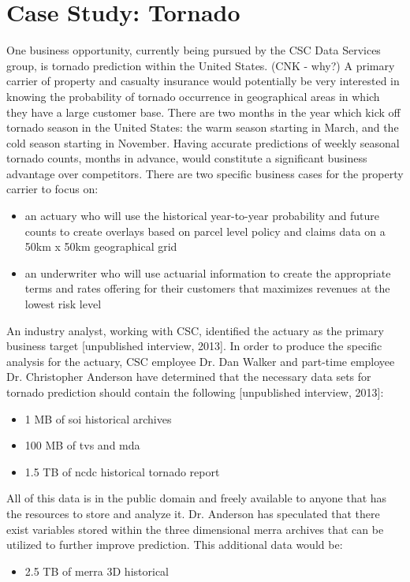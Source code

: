 

\section{Case Study: Tornado}
One business opportunity, currently being pursued by the \textsc{CSC} Data Services group, is tornado prediction within the United States. (CNK - why?) A primary carrier of property and casualty insurance would potentially be very interested in knowing the probability of tornado occurrence in geographical areas in which they have a large customer base. There are two months in the year which kick off tornado season in the United States: the warm season starting in March, and the cold season starting in November. Having accurate predictions of weekly seasonal tornado counts, months in advance, would constitute a significant business advantage over competitors. There are two specific business cases for the property carrier to focus on:
\begin{itemize}
    \item an actuary who will use the historical year-to-year probability and future counts to create overlays based on parcel level policy and claims data on a 50km x 50km geographical grid
    \item an underwriter who will use actuarial information to create the appropriate terms and rates offering for their customers that maximizes revenues at the lowest risk level
\end{itemize}
An industry analyst, working with \textsc{CSC}, identified the actuary as the primary business target [unpublished interview, 2013]. In order to produce the specific analysis for the actuary, \textsc{CSC} employee Dr. Dan Walker and part-time employee Dr. Christopher Anderson have determined that the necessary data sets for tornado prediction should contain the following [unpublished interview, 2013]:
\begin{itemize}
    \item 1 MB of \gls{soi} historical archives \cite{bom}
    \item 100 MB of \gls{tvs} and \gls{mda} \cite{hdss}
    \item 1.5 TB of \gls{ncdc} historical tornado report \cite{ncdc}
\end{itemize}
All of this data is in the public domain and freely available to anyone that has the resources to store and analyze it. Dr. Anderson has speculated that there exist variables stored within the three dimensional \gls{merra} archives that can be utilized to further improve prediction. This additional data would be:
\begin{itemize}
    \item 2.5 TB of \gls{merra} 3D historical \cite{mdisc}
\end{itemize}
